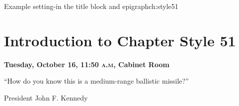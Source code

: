 \begin{texexample}{Example setting-in the title block and epigraph}{ch:style51}
\chapter{Introduction to Chapter Style 51}
\epigraph{\textbf{\sffamily Tuesday, October 16, 11:50 \textsc{a.m}, Cabinet Room}\par
               ``How do you know this is a medium-range ballistic missile?''}{President John F. Kennedy}
\lorem
\end{texexample}

